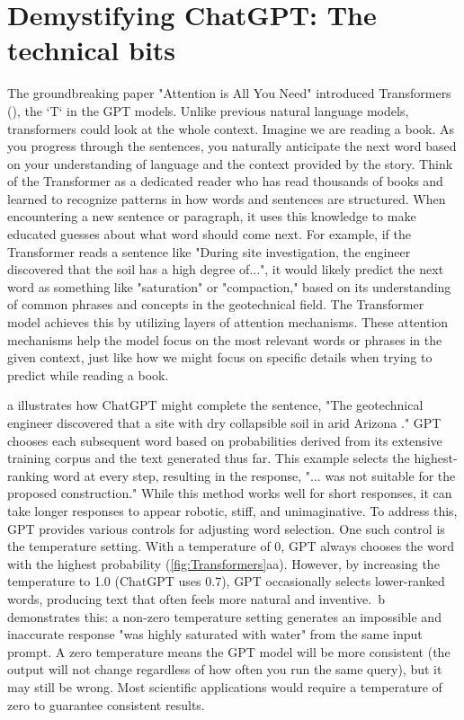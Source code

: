 \documentclass{article}
\begin{document}
\section{Demystifying ChatGPT: The technical bits}
The groundbreaking paper "Attention is All You Need" introduced Transformers (\cite{vaswani2017attention}), the `T` in the GPT models. Unlike previous natural language models, transformers could look at the whole context. Imagine we are reading a book. As you progress through the sentences, you naturally anticipate the next word based on your understanding of language and the context provided by the story. Think of the Transformer as a dedicated reader who has read thousands of books and learned to recognize patterns in how words and sentences are structured. When encountering a new sentence or paragraph, it uses this knowledge to make educated guesses about what word should come next. For example, if the Transformer reads a sentence like "During site investigation, the engineer discovered that the soil has a high degree of...", it would likely predict the next word as something like "saturation" or "compaction," based on its understanding of common phrases and concepts in the geotechnical field. The Transformer model achieves this by utilizing layers of attention mechanisms. These attention mechanisms help the model focus on the most relevant words or phrases in the given context, just like how we might focus on specific details when trying to predict while reading a book.

a illustrates how ChatGPT might complete the sentence, "The geotechnical engineer discovered that a site with dry collapsible soil in arid Arizona \underline{\hspace{1cm}}." GPT chooses each subsequent word based on probabilities derived from its extensive training corpus and the text generated thus far. This example selects the highest-ranking word at every step, resulting in the response, "... was not suitable for the proposed construction." While this method works well for short responses, it can take longer responses to appear robotic, stiff, and unimaginative. To address this, GPT provides various controls for adjusting word selection. One such control is the temperature setting. With a temperature of 0, GPT always chooses the word with the highest probability (\cref{fig:Transformers}aa). However, by increasing the temperature to 1.0 (ChatGPT uses 0.7), GPT occasionally selects lower-ranked words, producing text that often feels more natural and inventive.~b demonstrates this: a non-zero temperature setting generates an impossible and inaccurate response "was highly saturated with water" from the same input prompt. A zero temperature means the GPT model will be more consistent (the output will not change regardless of how often you run the same query), but it may still be wrong. Most scientific applications would require a temperature of zero to guarantee consistent results. 
\end{document}
